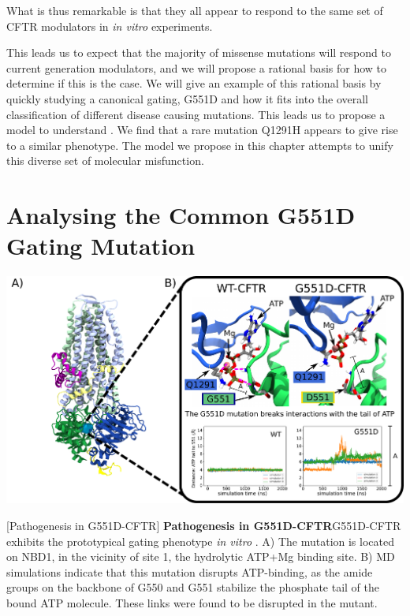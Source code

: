 What is thus remarkable is that they all appear to respond to the same set of CFTR modulators in \textit{in vitro} experiments. 

This leads us to expect that the majority of missense mutations will respond to current generation modulators, and we will propose a rational basis for how to determine if this is the case. We will give an example of this rational basis by quickly studying a canonical gating, G551D and how it fits into the overall classification of different disease causing mutations. This leads us to propose a model to understand . We find that a rare mutation Q1291H appears to give rise to a similar phenotype. The model we propose in this chapter attempts to unify this diverse set of molecular misfunction.

\section{Analysing the Common G551D Gating Mutation}

	\begin{center}
		\includegraphics[width=\textwidth]{figures/perspective/G551D.pdf}
	\end{center}
\begingroup
\captionsetup{singlelinecheck = false, justification=raggedright}
[Pathogenesis in G551D-CFTR] {\textbf{Pathogenesis in G551D-CFTR}}{G551D-CFTR exhibits the prototypical gating phenotype \textit{in vitro} \cite{bompadre2007, wang2020}. A) The mutation is located on NBD1, in the vicinity of site 1, the hydrolytic ATP+Mg binding site. B) MD simulations indicate that this mutation disrupts ATP-binding, as the amide groups on the backbone of G550 and G551 stabilize the phosphate tail of the bound ATP molecule. These links were found to be disrupted in the mutant.} 
\label{G551D_results}
\endgroup

